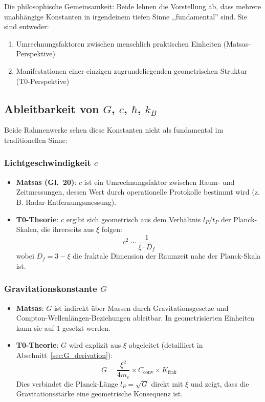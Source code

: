 	Die philosophische Gemeinsamkeit: Beide lehnen die Vorstellung ab, dass mehrere unabhängige Konstanten in irgendeinem tiefen Sinne ,,fundamental'' sind. Sie sind entweder:
	\begin{enumerate}
		\item Umrechnungsfaktoren zwischen menschlich praktischen Einheiten (Matsas-Perspektive)
		\item Manifestationen einer einzigen zugrundeliegenden geometrischen Struktur (T0-Perspektive)
	\end{enumerate}
	
	\subsection{Ableitbarkeit von $G$, $c$, $\hbar$, $k_B$}
	
	Beide Rahmenwerke sehen diese Konstanten nicht als fundamental im traditionellen Sinne:
	
	\subsubsection{Lichtgeschwindigkeit $c$}
	
	\begin{itemize}
		\item \textbf{Matsas (Gl.~20)}: $c$ ist ein Umrechnungsfaktor zwischen Raum- und Zeitmessungen, dessen Wert durch operationelle Protokolle bestimmt wird (z.\,B. Radar-Entfernungsmessung).
		
		\item \textbf{T0-Theorie}: $c$ ergibt sich geometrisch aus dem Verhältnis $l_P/t_P$ der Planck-Skalen, die ihrerseits aus $\xi$ folgen:
		\[
		c^2 \sim \frac{1}{\xi \cdot D_f}
		\]
		wobei $D_f = 3 - \xi$ die fraktale Dimension der Raumzeit nahe der Planck-Skala ist.
	\end{itemize}
	
	\subsubsection{Gravitationskonstante $G$}
	
	\begin{itemize}
		\item \textbf{Matsas}: $G$ ist indirekt über Massen durch Gravitationsgesetze und Compton-Wellenlängen-Beziehungen ableitbar. In geometrisierten Einheiten kann sie auf 1 gesetzt werden.
		
		\item \textbf{T0-Theorie}: $G$ wird explizit aus $\xi$ abgeleitet (detailliert in Abschnitt~\ref{sec:G_derivation}):
		\[
		G = \frac{\xi^2}{4 m_e} \times C_{\text{conv}} \times K_{\text{frak}}
		\]
		Dies verbindet die Planck-Länge $l_P = \sqrt{G}$ direkt mit $\xi$ und zeigt, dass die Gravitationsstärke eine geometrische Konsequenz ist.
	\end{itemize}
	
